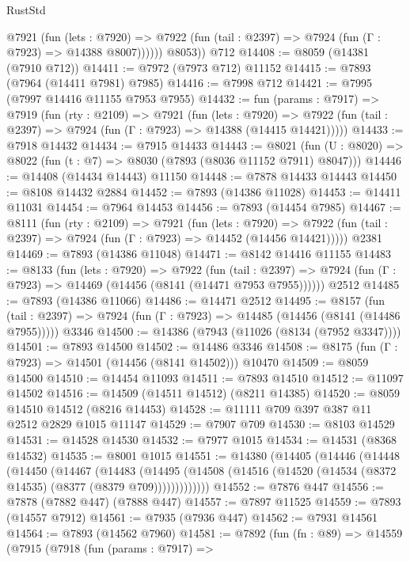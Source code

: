 \begin{lexlean}{RustStd}
\begin{coremodule}
{\begin{coremodule}
{{{{{{{{{{{{{{{{{{{{{{{{{{{{{{{{{{{{{{{{{{{{{{{{{{            @7921
              (fun (lets : @7920) =>
              @7922 (fun (tail : @2397) => @7924 (fun (Γ : @7923) => @14388 @8007))))))
        @8053))
    @712
@14408 := @8059 (@14381 (@7910 @712))
@14411 := @7972 (@7973 @712) @11152
@14415 := @7893 (@7964 (@14411 @7981) @7985)
@14416 := @7998 @712
@14421 := @7995 (@7997 @14416 @11155 @7953 @7955)
@14432 := fun (params : @7917) =>
  @7919
    (fun (rty : @2109) =>
    @7921
      (fun (lets : @7920) =>
      @7922 (fun (tail : @2397) => @7924 (fun (Γ : @7923) => @14388 (@14415 @14421)))))
@14433 := @7918 @14432
@14434 := @7915 @14433
@14443 := @8021
    (fun (U : @8020) => @8022 (fun (t : @7) => @8030 (@7893 (@8036 @11152 @7911) @8047)))
@14446 := @14408 (@14434 @14443) @11150
@14448 := @7878 @14433 @14443
@14450 := @8108 @14432 @2884
@14452 := @7893 (@14386 @11028)
@14453 := @14411 @11031
@14454 := @7964 @14453
@14456 := @7893 (@14454 @7985)
@14467 := @8111
    (fun (rty : @2109) =>
    @7921
      (fun (lets : @7920) =>
      @7922 (fun (tail : @2397) => @7924 (fun (Γ : @7923) => @14452 (@14456 @14421)))))
    @2381
@14469 := @7893 (@14386 @11048)
@14471 := @8142 @14416 @11155
@14483 := @8133
    (fun (lets : @7920) =>
    @7922
      (fun (tail : @2397) =>
      @7924 (fun (Γ : @7923) => @14469 (@14456 (@8141 (@14471 @7953 @7955))))))
    @2512
@14485 := @7893 (@14386 @11066)
@14486 := @14471 @2512
@14495 := @8157
    (fun (tail : @2397) => @7924 (fun (Γ : @7923) => @14485 (@14456 (@8141 (@14486 @7955)))))
    @3346
@14500 := @14386 (@7943 (@11026 (@8134 (@7952 @3347))))
@14501 := @7893 @14500
@14502 := @14486 @3346
@14508 := @8175 (fun (Γ : @7923) => @14501 (@14456 (@8141 @14502))) @10470
@14509 := @8059 @14500
@14510 := @14454 @11093
@14511 := @7893 @14510
@14512 := @11097 @14502
@14516 := @14509 (@14511 @14512) (@8211 @14385)
@14520 := @8059 @14510 @14512 (@8216 @14453)
@14528 := @11111 @709 @397 @387 @11 @2512 @2829 @1015 @11147
@14529 := @7907 @709
@14530 := @8103 @14529
@14531 := @14528 @14530
@14532 := @7977 @1015
@14534 := @14531 (@8368 @14532)
@14535 := @8001 @1015
@14551 := @14380
    (@14405
      (@14446
        (@14448
          (@14450
            (@14467
              (@14483
                (@14495
                  (@14508 (@14516 (@14520 (@14534 (@8372 @14535) (@8377 (@8379 @709)))))))))))))
@14552 := @7876 @447
@14556 := @7878 (@7882 @447) (@7888 @447)
@14557 := @7897 @11525
@14559 := @7893 (@14557 @7912)
@14561 := @7935 (@7936 @447)
@14562 := @7931 @14561
@14564 := @7893 (@14562 @7960)
@14581 := @7892
    (fun (fn : @89) =>
    @14559
      (@7915
        (@7918
          (fun (params : @7917) =>
}}}}}}}}}}}}}}}}}}}}}}}}}}}}}}}}}}}}}}}}}}}}}}}}}}
\end{coremodule}}
\end{coremodule}
\end{lexlean}
